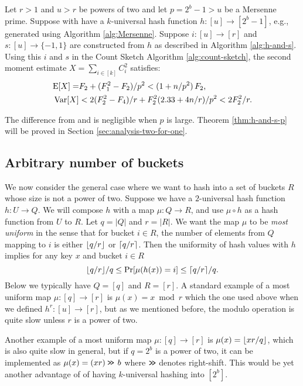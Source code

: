 \begin{theorem}\label{thm:h-and-s-p}
   Let $r>1$ and $u>r$ be powers of two and let $p=2^b-1>u$ be a
   Mersenne prime.
   Suppose with have a $k$-universal hash function $h:[u]\to[2^b-1]$, e.g.,
   generated using Algorithm \ref{alg:Mersenne}. Suppose
   $i:[u]\to[r]$ and
   $s:[u]\to\{-1,1\}$ are constructed from $h$ as described in
   Algorithm \ref{alg:h-and-s}. Using this $i$ and $s$ 
   in the Count Sketch Algorithm \ref{alg:count-sketch}, the second moment 
   estimate $X=\sum_{i\in[k]} C_i^2$ satisfies:
   \begin{align}
      \operatorname*{E}[X]=&F_2+(F_1^2-F_2)/p^2 < (1+n/p^2)\,F_2\textnormal,\label{eq:E-F2-p}\\
      \operatorname*{Var}[X]&< 2(F_2^2-F_4)/r+F_2^2 (2.33+4 n/r)/p^2<2F_2^2/r.\label{eq:V-F2-p}
   \end{align}
\end{theorem}
The difference from  and  
is negligible when $p$ is large. Theorem \ref{thm:h-and-s-p} will be
proved in Section \ref{sec:analysis-two-for-one}.


\subsection{Arbitrary number of buckets}\label{sec:most-uniform}
We now consider the general case where we want to hash into a set of buckets $R$ whose size is not a power of two.
Suppose we have a $2$-universal hash function $h:U\to Q$.
We will compose $h$ with a map $\mu:Q\to R$, and use $\mu\circ h$ as a hash function from $U$ to $R$.
Let $q=|Q|$ and $r=|R|$.
We want the map $\mu$ to be \emph{most uniform} in the sense that for bucket $i\in R$, the number of elements from $Q$ mapping to $i$ is either $\lfloor {q/r} \rfloor$ or $\lceil {q/r}\rceil$.
Then the uniformity of hash values with $h$ implies for any key $x$ and bucket $i\in R$ \[\lfloor {q/r} \rfloor/q\leq \Pr[\mu(h(x))=i]\leq \lceil {q/r}\rceil/q.\]
Below we typically have $Q=[q]$ and $R=[r]$.
A standard example of a most uniform map $\mu:[q]\to[r]$ is $\mu(x)=x\bmod r$ which the one used above when we defined $h^r:[u]\to[r]$, but as we mentioned before, the modulo operation is quite slow unless $r$ is a power of two.

Another example of a most uniform map $\mu:[q]\to[r]$ 
is $\mu(x)=\lfloor {xr/q} \rfloor$,
which is also quite slow in general, but if $q=2^b$ is a power of two,
it can be implemented as $\mu(x)=(xr)\mathbin{\texttt{>\!>}}\,b$ where 
$\mathbin{\texttt{>\!>}}$ denotes right-shift. This would be yet another advantage 
of of having $k$-universal hashing into $[2^b]$.

